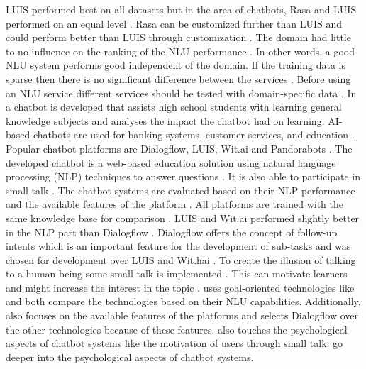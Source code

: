 LUIS performed best on all datasets but in the area of chatbots, Rasa and LUIS performed on an equal level \cite{braunEvaluatingNLU}.
Rasa can be customized further than LUIS and could perform better than LUIS through customization \cite{braunEvaluatingNLU}. 
The domain had little to no influence on the ranking of the NLU performance \cite{braunEvaluatingNLU}.
In other words, a good NLU system performs good independent of the domain.
If the training data is sparse then there is no significant difference between the services \cite{braunEvaluatingNLU}. 
Before using an NLU service different services should be tested with domain-specific data \cite{braunEvaluatingNLU}.
In \citet{dutta2017developing} a chatbot is developed that assists high school students with learning general 
knowledge subjects and analyses the impact the chatbot had on learning.
AI-based chatbots are used for banking systems, customer services, and education \cite{dutta2017developing}.
Popular chatbot platforms are Dialogflow, LUIS, Wit.ai and Pandorabots \cite{dutta2017developing}.
The developed chatbot is a web-based education solution using natural language processing (NLP) techniques
to answer questions \cite{dutta2017developing}.
It is also able to participate in small talk \cite{dutta2017developing}.
The chatbot systems are evaluated based on their NLP performance and the available features of the platform 
\cite{dutta2017developing}. 
All platforms are trained with the same knowledge base for comparison \cite{dutta2017developing}. 
LUIS and Wit.ai performed slightly better in the NLP part than Dialogflow \cite{dutta2017developing}.
Dialogflow offers the concept of follow-up intents which is an important feature for the development 
of sub-tasks and was chosen for development over LUIS and Wit.hai \cite{dutta2017developing}.
To create the illusion of talking to a human being some small talk is implemented \cite{dutta2017developing}. 
This can motivate learners and might increase the interest in the topic \cite{dutta2017developing}.
\citet{dutta2017developing} uses goal-oriented technologies like \citet{braunEvaluatingNLU} and 
both compare the technologies based on their NLU capabilities.
Additionally, \citet{dutta2017developing} also focuses on the available features of the 
platforms and selects Dialogflow over the other technologies because 
of these features.
\citet{dutta2017developing} also touches the psychological aspects of chatbot systems 
like the motivation of users through small talk. 
\citet{GO2019304, brandtzaeg2018chatbots,folstad2017chatbots} go deeper into the psychological aspects of chatbot systems.
